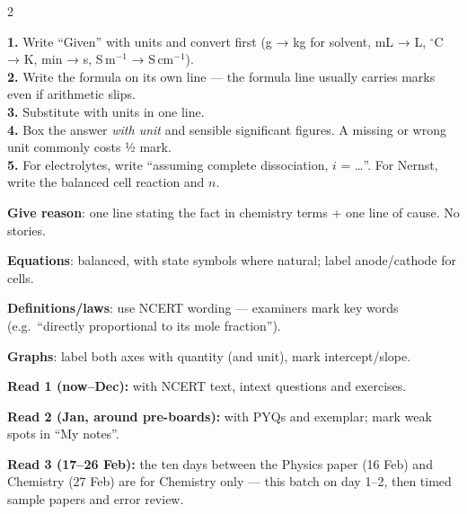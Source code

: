 \documentclass[10pt,a4paper]{extarticle}
\begin{document}
\begin{multicols}{2}
\columnbreak
{}
\begin{kbox}\small
\textbf{1.} Write ``Given'' with units and convert first (g → kg for solvent, mL → L, $^\circ$C → K, min → s, S\,m$^{-1}$ → S\,cm$^{-1}$).\\
\textbf{2.} Write the formula on its own line — the formula line usually carries marks even if arithmetic slips.\\
\textbf{3.} Substitute with units in one line.\\
\textbf{4.} Box the answer \emph{with unit} and sensible significant figures. A missing or wrong unit commonly costs ½ mark.\\
\textbf{5.} For electrolytes, write ``assuming complete dissociation, $i$ = …''. For Nernst, write the balanced cell reaction and $n$.
\end{kbox}
\begin{fl}
\item \textbf{Give reason}: one line stating the fact in chemistry terms + one line of cause. No stories.
\item \textbf{Equations}: balanced, with state symbols where natural; label anode/cathode for cells.
\item \textbf{Definitions/laws}: use NCERT wording — examiners mark key words (e.g.\ ``directly proportional to its mole fraction'').
\item \textbf{Graphs}: label both axes with quantity (and unit), mark intercept/slope.
\end{fl}
\begin{fl}
\item \textbf{Read 1 (now–Dec):} with NCERT text, intext questions and exercises.
\item \textbf{Read 2 (Jan, around pre-boards):} with PYQs and exemplar; mark weak spots in ``My notes''.
\item \textbf{Read 3 (17--26 Feb):} the ten days between the Physics paper (16 Feb) and Chemistry (27 Feb) are for Chemistry only — this batch on day 1--2, then timed sample papers and error review.
\end{fl}
\end{multicols}
\end{document}
